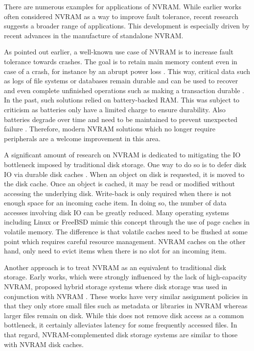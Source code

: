 There are numerous examples for applications of \ac{NVRAM}. While earlier works
often considered \ac{NVRAM} as a way to improve fault tolerance, recent research
suggests a broader range of applications. This development is especially driven
by recent advances in the manufacture of standalone \ac{NVRAM}.

As pointed out earlier, a well-known use case of \ac{NVRAM} is to increase fault
tolerance towards crashes. The goal is to retain main memory content even in
case of a crash, for instance by an abrupt power loss \cite{molina1992main,
eich1986main}. This way, critical data such as logs of file systems or databases
remain durable and can be used to recover and even complete unfinished
operations such as making a transaction durable \cite{liskov1991replication,
chen1996rio}. In the past, such solutions relied on battery-backed \ac{RAM}.
This was subject to criticism as batteries only have a limited charge to ensure
durability. Also batteries degrade over time and need to be maintained to
prevent unexpected failure \cite{molina1992main}. Therefore, modern \ac{NVRAM}
solutions which no longer require peripherals are a welcome improvement in this
area.

A significant amount of research on \ac{NVRAM} is dedicated to mitigating the
\ac{IO} bottleneck imposed by traditional disk storage. One way to do so is to
defer disk \ac{IO} via durable disk caches \cite{chen1996rio, wu1994envy}. When
an object on disk is requested, it is moved to the disk cache. Once an object is
cached, it may be read or modified without accessing the underlying disk.
Write-back is only required when there is not enough space for an incoming cache
item. In doing so, the number of data accesses involving disk \ac{IO} can be
greatly reduced. Many operating systems including Linux or FreeBSD mimic this
concept through the use of page caches in volatile memory. The difference is
that volatile caches need to be flushed at some point which requires careful
resource management. \ac{NVRAM} caches on the other hand, only need to evict
items when there is no slot for an incoming item.

Another approach is to treat \ac{NVRAM} as an equivalent to traditional disk
storage. Early works, which were strongly influenced by the lack of
high-capacity \ac{NVRAM}, proposed hybrid storage systems where disk storage was
used in conjunction with \ac{NVRAM} \cite{wang2002conquest, miller2001hermes}.
These works have very similar assignment policies in that they only store small
files such as metadata or libraries in \ac{NVRAM} whereas larger files remain on
disk. While this does not remove disk access as a common bottleneck, it
certainly alleviates latency for some frequently accessed files. In that regard,
\ac{NVRAM}-complemented disk storage systems are similar to those with
\ac{NVRAM} disk caches.

